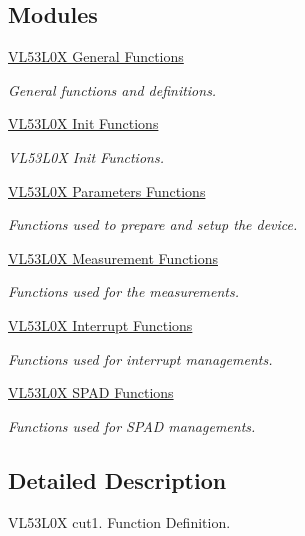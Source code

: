 \subsection*{Modules}
\begin{DoxyCompactItemize}
\item 
\hyperlink{group__VL53L0X__general__group}{V\+L53\+L0\+X General Functions}
\begin{DoxyCompactList}\small\item\em General functions and definitions. \end{DoxyCompactList}\item 
\hyperlink{group__VL53L0X__init__group}{V\+L53\+L0\+X Init Functions}
\begin{DoxyCompactList}\small\item\em V\+L53\+L0X Init Functions. \end{DoxyCompactList}\item 
\hyperlink{group__VL53L0X__parameters__group}{V\+L53\+L0\+X Parameters Functions}
\begin{DoxyCompactList}\small\item\em Functions used to prepare and setup the device. \end{DoxyCompactList}\item 
\hyperlink{group__VL53L0X__measurement__group}{V\+L53\+L0\+X Measurement Functions}
\begin{DoxyCompactList}\small\item\em Functions used for the measurements. \end{DoxyCompactList}\item 
\hyperlink{group__VL53L0X__interrupt__group}{V\+L53\+L0\+X Interrupt Functions}
\begin{DoxyCompactList}\small\item\em Functions used for interrupt managements. \end{DoxyCompactList}\item 
\hyperlink{group__VL53L0X__SPADfunctions__group}{V\+L53\+L0\+X S\+P\+A\+D Functions}
\begin{DoxyCompactList}\small\item\em Functions used for S\+P\+AD managements. \end{DoxyCompactList}\end{DoxyCompactItemize}


\subsection{Detailed Description}
V\+L53\+L0X cut1. Function Definition. 

